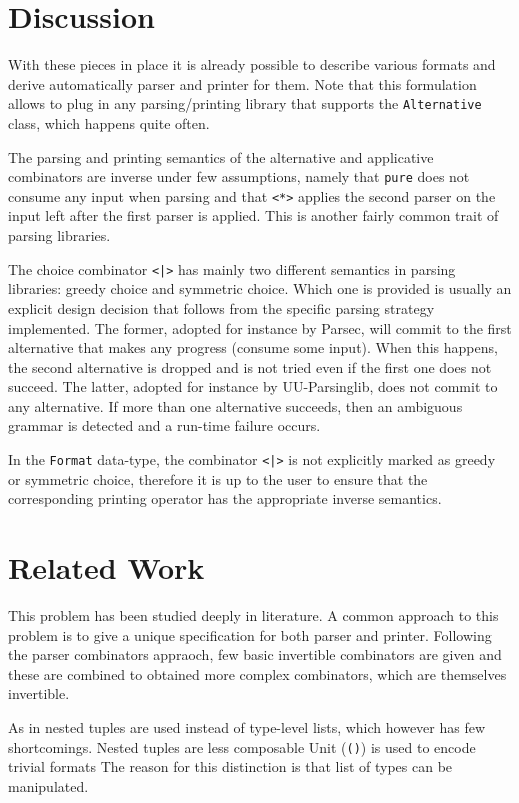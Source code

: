 \documentclass[../Thesis.tex]{subfiles}
\begin{document}
\section{Discussion}
\label{sec:Discussion}
With these pieces in place it is already possible to describe various formats and derive automatically parser and printer for them. Note that this formulation allows to plug in any parsing/printing library that supports the \texttt{Alternative} class, which happens quite often. 

The parsing and printing semantics of the alternative and applicative combinators are inverse under few assumptions,
namely that \texttt{pure} does not consume any input when parsing and that \texttt{<*>} applies the second parser on the input left after the first parser is applied. This is another fairly common trait of parsing libraries.

The choice combinator \texttt{<|>} has mainly two different semantics in parsing libraries: greedy choice and symmetric choice. Which one is provided is usually an explicit design decision that follows from the specific parsing strategy implemented.
The former, adopted for instance by Parsec, will commit to the first alternative that makes any progress (consume some input). When this happens, the second alternative is dropped and is not tried even if the first one does not succeed. The latter, adopted for instance by UU-Parsinglib, does not commit to any alternative. If more than one alternative succeeds, then an ambiguous grammar is detected and a run-time failure occurs.

In the \texttt{Format} data-type, the combinator \texttt{<|>} is not explicitly marked as greedy or symmetric choice, therefore it is up to the user to ensure that the corresponding printing operator has the appropriate inverse semantics.


\section{Related Work}
This problem has been studied deeply in literature. 
A common approach to this problem is to give a unique specification for 
both parser and printer.
Following the parser combinators appraoch, few basic invertible combinators are given and these are combined to obtained more complex combinators, which are themselves invertible.

As in \cite{Rendel10ISD} nested tuples are used instead of type-level lists, which however has few shortcomings.
Nested tuples are less composable 
Unit (\texttt{()}) is used to encode trivial formats
The reason for this distinction is that list of types
can be manipulated.
\end{document}
